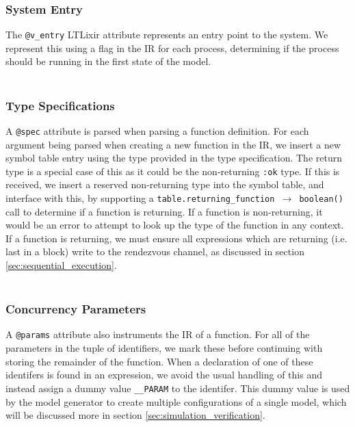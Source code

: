 \subsubsection{System Entry}
The \texttt{@v\_entry} LTLixir attribute represents an entry point to the system. We represent this using a flag in the IR for each process, determining if the process should be running in the first state of the model.
\\ \\
\subsubsection{Type Specifications}
A \texttt{@spec} attribute is parsed when parsing a function definition. For each argument being parsed when creating a new function in the IR, we insert a new symbol table entry using the type provided in the type specification. The return type is a special case of this as it could be the non-returning \texttt{:ok} type. If this is received, we insert a reserved non-returning type into the symbol table, and interface with this, by supporting a \texttt{table.returning\_function $\rightarrow$ boolean()} call to determine if a function is returning. If a function is non-returning, it would be an error to attempt to look up the type of the function in any context. If a function is returning, we must ensure all expressions which are returning (i.e. last in a block) write to the rendezvous channel, as discussed in section \ref{sec:sequential_execution}.
\\ \\
\subsubsection{Concurrency Parameters}
A \texttt{@params} attribute also instruments the IR of a function. For all of the parameters in the tuple of identifiers, we mark these before continuing with storing the remainder of the function. When a declaration of one of these identifers is found in an expression, we avoid the usual handling of this and instead assign a dummy value \texttt{\_\_PARAM} to the identifer. This dummy value is used by the model generator to create multiple configurations of a single model, which will be discussed more in section \ref{sec:simulation_verification}.
\\ \\
